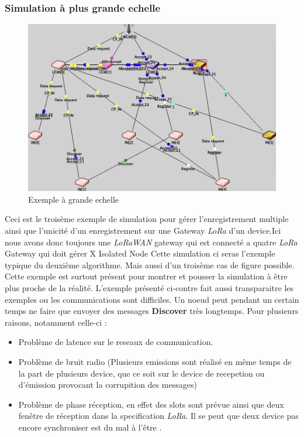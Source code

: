 \documentclass[11pt]{article}
\begin{document}
\subsubsection{Simulation à plus grande echelle }
\begin{figure}[!ht]
\centering
\includegraphics[scale=0.45]{fat.png} 
\caption{Exemple à grande echelle}
\end{figure}
Ceci est le troisème exemple de simulation pour gérer l'enregistrement multiple ainsi que l'unicité d'un enregistrement sur une Gateway \textit{LoRa} d'un device.Ici nous avons donc toujours une  \textit{LoRaWAN} gateway qui est connecté a quatre \textit{LoRa} Gateway qui doit gérer X Isolated Node Cette simulation ci seras l'exemple typique du deuxième algorithme. Mais aussi d'un troisème cas de figure possible. Cette exemple est surtout présent pour montrer et pousser la simulation à être plus proche de la réalité.
L'exemple présenté ci-contre fait aussi transparaitre les exemples ou les communications sont difficiles. Un noeud peut pendant un certain temps ne faire que envoyer des messages \textbf{Discover} très longtemps. Pour plusieurs raisons, notamment celle-ci : 
\begin{itemize}
\item Problème de latence sur le reseaux de communication. 
\item Problème de bruit radio (Plusieurs emissions sont réalisé en même temps de la part de plusieurs device, que ce soit sur le device de recepetion ou d'émission provocant la corrupition des messages)
\item Problème de phase réception, en effet des slots sont prévue ainsi que deux fenêtre de réception dans la specification \textit{LoRa}. Il se peut que deux device pas encore synchroniser est du mal à l'être .
\end{itemize}
\newpage
\end{document}
